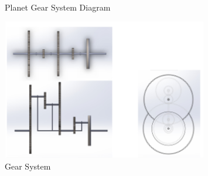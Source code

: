 \documentclass[10pt, letterpaper]{article}
\begin{document}
\begin{figure}[!b]
\begin{minipage}[c]{0.33\linewidth}
            \caption{Planet Gear System Diagram}
        \end{minipage}%
        \begin{minipage}[c]{0.33\linewidth}
            \centering
            \includegraphics[width=0.8\textwidth]{fig/Mechanical Design/齒輪系繪製.png}
            \caption{Gear System}
        \end{minipage} 

        \vspace{0.5 cm}
        

\end{figure}
\end{document}
